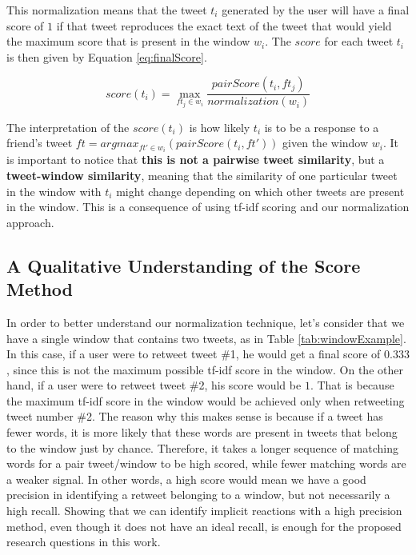 This normalization means that the tweet $t_i$ generated by the user will have a final score of $1$ if that tweet reproduces the exact text of the tweet that would yield the maximum score that is present in the window $w_i$. The $score$ for each tweet $t_i$ is then given by Equation \ref{eq:finalScore}.

\begin{equation}
score(t_i) =  \max_{ft_j \in w_i}\frac{pairScore(t_i,ft_j)}{normalization(w_i)}
\label{eq:finalScore}
\end{equation}

\color{red}
The interpretation of the $score(t_i)$ is how likely $t_i$ is to be a response to a friend's tweet $ft = argmax_{ft' \in w_i}(pairScore(t_i,ft'))$ given the window $w_i$. It is important to notice that \textbf{this is not a pairwise tweet similarity}, but a \textbf{tweet-window similarity}, meaning that the similarity of one particular tweet in the window with $t_i$ might change depending on which other tweets are present in the window. This is a consequence of using tf-idf scoring and our normalization approach. 

\subsection{A Qualitative Understanding of the Score Method}

In order to better understand our normalization technique, let's consider that we have a single window that contains two tweets, as in Table \ref{tab:windowExample}. In this case, if a user were to retweet tweet \#1, he would get a final score of $0.333$, since this is not the maximum possible tf-idf score in the window. On the other hand, if a user were to retweet tweet \#2, his score would be $1$. That is because the maximum tf-idf score in the window would be achieved only when retweeting tweet number \#2. The reason why this makes sense is because if a tweet has fewer words, it is more likely that these words are present in tweets that belong to the window just by chance. Therefore, it takes a longer sequence of matching words for a pair tweet/window to be high scored, while fewer matching words are a weaker signal. In other words, a high score would mean we have a good precision in identifying a retweet belonging to a window, but not necessarily a high recall. Showing that we can identify implicit reactions with a high precision method, even though it does not have an ideal recall, is enough for the proposed research questions in this work.

